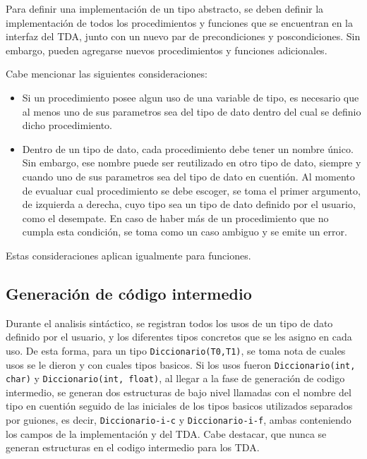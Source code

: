 Para definir una implementación de un tipo abstracto, se deben definir la
implementación de todos los procedimientos y funciones que se encuentran en la
interfaz del TDA, junto con un nuevo par de precondiciones y poscondiciones.
Sin embargo, pueden agregarse nuevos procedimientos y funciones adicionales.

Cabe mencionar las siguientes consideraciones:

\begin{itemize}

  \item Si un procedimiento posee algun uso de una variable de tipo, es
  necesario que al menos uno de sus parametros sea del tipo de dato dentro del
  cual se definio dicho procedimiento.

  \item Dentro de un tipo de dato, cada procedimiento debe tener un nombre único.
  Sin embargo, ese nombre puede ser reutilizado en otro tipo de dato, siempre
  y cuando uno de sus parametros sea del tipo de dato en cuentión. Al momento
  de evualuar cual procedimiento se debe escoger, se toma el primer
  argumento, de izquierda a derecha, cuyo tipo sea un tipo de dato definido por
  el usuario, como el desempate. En caso de haber más de un procedimiento que
  no cumpla esta condición, se toma como un caso ambiguo y se emite un error.

\end{itemize}

Estas consideraciones aplican igualmente para funciones.


\subsection{Generación de código intermedio}
Durante el analisis sintáctico, se registran todos los usos de un tipo de dato
definido por el usuario, y los diferentes tipos concretos que se les asigno en
cada uso. De esta forma, para un tipo \texttt{Diccionario(T0,T1)}, se toma nota de
cuales usos se le dieron y con cuales tipos basicos. Si los usos fueron
\texttt{Diccionario(int, char)} y \texttt{Diccionario(int, float)}, al llegar a la fase de
generación de codigo intermedio, se generan dos estructuras de bajo nivel
llamadas con el nombre del tipo en cuentión seguido de las iniciales de los
tipos basicos utilizados separados por guiones, es decir,
\texttt{Diccionario-i-c} y \texttt{Diccionario-i-f}, ambas conteniendo los
campos de la implementación y del TDA. Cabe destacar, que nunca se generan
estructuras en el codigo intermedio para los TDA.

